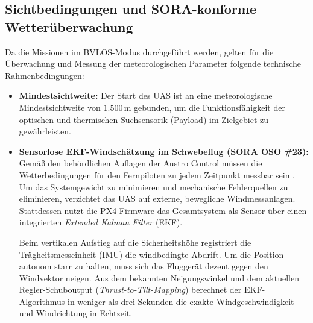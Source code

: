 \subsection{Sichtbedingungen und SORA-konforme Wetterüberwachung}
Da die Missionen im BVLOS-Modus durchgeführt werden, gelten für die Überwachung und Messung der meteorologischen Parameter folgende technische Rahmenbedingungen:
\begin{itemize}
    \item \textbf{Mindestsichtweite:} Der Start des UAS ist an eine meteorologische Mindestsichtweite von $1.500\,\text{m}$ gebunden, um die Funktionsfähigkeit der optischen und thermischen Suchsensorik (Payload) im Zielgebiet zu gewährleisten.
    \item \textbf{Sensorlose EKF-Windschätzung im Schwebeflug (SORA OSO \#23):} Gemäß den behördlichen Auflagen der Austro Control müssen die Wetterbedingungen für den Fernpiloten zu jedem Zeitpunkt messbar sein . 
                                                                                Um das Systemgewicht zu minimieren und mechanische Fehlerquellen zu eliminieren, verzichtet das UAS auf externe, bewegliche Windmessanlagen. 
                                                                                Stattdessen nutzt die PX4-Firmware das Gesamtsystem als Sensor über einen integrierten \textit{Extended Kalman Filter} (EKF). 
    
    Beim vertikalen Aufstieg auf die Sicherheitshöhe registriert die Trägheitsmesseinheit (IMU) die windbedingte Abdrift. Um die Position autonom starr zu halten, muss sich das Fluggerät dezent gegen den Windvektor neigen. 
    Aus dem bekannten Neigungswinkel und dem aktuellen Regler-Schuboutput (\textit{Thrust-to-Tilt-Mapping}) berechnet der EKF-Algorithmus in weniger als drei Sekunden die exakte Windgeschwindigkeit und Windrichtung in Echtzeit.
    

\end{itemize}
